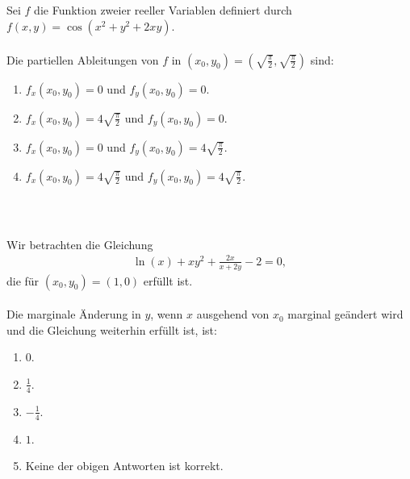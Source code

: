 \subsection*{}
Sei $f$ die Funktion zweier reeller Variablen definiert durch $f(x,y) = \cos(x^2 +y^2 + 2xy).$\\
\\
Die partiellen Ableitungen von $f$ in $(x_0, y_0) = \left(\sqrt{\frac{\pi}{2}}, \sqrt{\frac{\pi}{2}}\right)$ sind:
\renewcommand{\labelenumi}{(\alph{enumi})}
\begin{enumerate}
\item 
$f_x(x_0,y_0) = 0$ und $f_y(x_0,y_0) = 0$.
\item
$f_x(x_0,y_0) = 4 \sqrt{\frac{\pi}{2}} $ und $f_y(x_0,y_0) = 0$.
\item
$f_x(x_0,y_0) = 0 $ und $f_y(x_0,y_0) = 4 \sqrt{\frac{\pi}{2}}$.
\item
$f_x(x_0,y_0) = 4 \sqrt{\frac{\pi}{2}} $ und $f_y(x_0,y_0) = 4 \sqrt{\frac{\pi}{2}}$.
\end{enumerate}
\ \\
\subsection*{}
Wir betrachten die Gleichung
\begin{align*}
	\ln(x) + x y^2 + \frac{2x}{x + 2y} - 2 = 0,
\end{align*}
die für $(x_0,y_0) = (1,0)$ erfüllt ist.\\
\\
Die marginale Änderung in $y$, wenn $x$ ausgehend von $x_0$ marginal geändert wird und die Gleichung weiterhin erfüllt ist, ist:
\renewcommand{\labelenumi}{(\alph{enumi})}
\begin{enumerate}
	\item 
	$ 0 $.
	\item
	$ \frac{1}{4}$.
	\item
	$ -\frac{1}{4}$.
	\item
	$ 1$.
	\item
	Keine der obigen Antworten ist korrekt.
\end{enumerate}
\ \\
